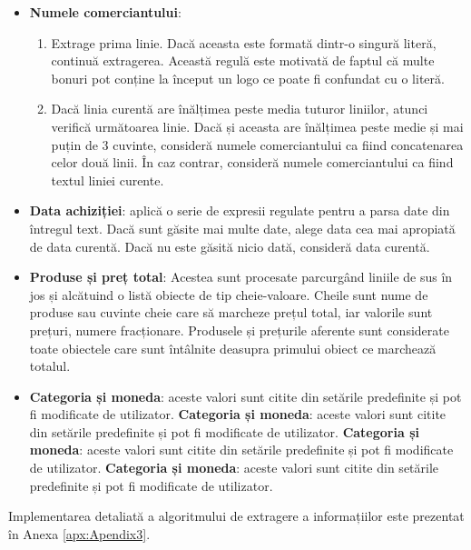 \begin{itemize}
  \item
  \textbf{Numele comerciantului}:
  \begin{enumerate}
      \item
      Extrage prima linie. Dacă aceasta este formată dintr-o singură literă, continuă extragerea. Această regulă este motivată de faptul că multe bonuri pot conține la început un logo ce poate fi confundat cu o literă.
      \item
      Dacă linia curentă are înălțimea peste media tuturor liniilor, atunci verifică următoarea linie. Dacă și aceasta are înălțimea peste medie și mai puțin de 3 cuvinte, consideră numele comerciantului ca fiind concatenarea celor două linii. În caz contrar, consideră numele comerciantului ca fiind textul liniei curente.
  \end{enumerate}
  \item
  \textbf{Data achiziției}: aplică o serie de expresii regulate pentru a parsa date din întregul text. Dacă sunt găsite mai multe date, alege data cea mai apropiată de data curentă. Dacă nu este găsită nicio dată, consideră data curentă.
  \item
  \textbf{Produse și preț total}: Acestea sunt procesate parcurgând liniile de sus în jos și alcătuind o listă obiecte de tip cheie-valoare. Cheile sunt nume de produse sau cuvinte cheie care să marcheze prețul total, iar valorile sunt prețuri, numere fracționare. Produsele și prețurile aferente sunt considerate toate obiectele care sunt întâlnite deasupra primului obiect ce marchează totalul.
  \item
  \textbf{Categoria și moneda}: aceste valori sunt citite din setările predefinite și pot fi modificate de utilizator.
  \textbf{Categoria și moneda}: aceste valori sunt citite din setările predefinite și pot fi modificate de utilizator.
  \textbf{Categoria și moneda}: aceste valori sunt citite din setările predefinite și pot fi modificate de utilizator.
  \textbf{Categoria și moneda}: aceste valori sunt citite din setările predefinite și pot fi modificate de utilizator.
\end{itemize}

Implementarea detaliată a algoritmului de extragere a informațiilor este prezentat în Anexa \ref{apx:Apendix3}.


